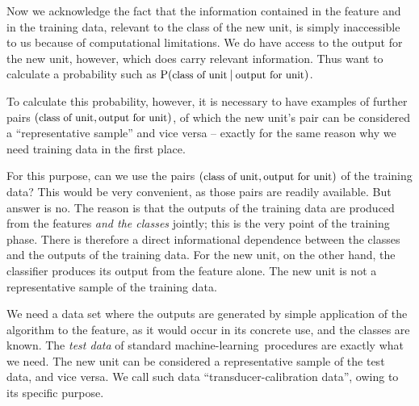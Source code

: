 \documentclass[\ifafour a4paper,12pt,\else a5paper,10pt,\fi%
onecolumn,oneside,article,%
british%
]{memoir}
\theoremstyle{remark}
\theoremstyle{innote}
\renewcommand*{\P}{\mathrm{P}}%
\renewcommand*{\|}[1][]{\nonscript\:#1\vert\nonscript\:\mathopen{}}
\newcommand*{\ml}{machine-learning}
\newcommand*{\texts}[1]{\text{\small #1}}
\begin{document}

Now we acknowledge the fact that the information contained in the feature and in the training data, relevant to the class of the new unit, is simply inaccessible to us because of computational limitations. We do have access to the output for the new unit, however, which does carry relevant information. Thus want to calculate a probability such as $\P(\texts{class of unit} \| \texts{output for unit})$.

To calculate this probability, however, it is necessary to have examples of further pairs $(\texts{class of unit}, \texts{output for unit})$, of which the new unit's pair can be considered a \enquote{representative sample} \autocites[for a critical analysis of the sometimes hollow term \enquote{representative sample} see][]{kruskaletal1979,kruskaletal1979b,kruskaletal1979c,kruskaletal1980} and vice versa -- exactly for the same reason why we need training data in the first place.

For this purpose, can we use the pairs $(\texts{class of unit}, \texts{output for unit})$ of the training data? This would be very convenient, as those pairs are readily available. But answer is no. The reason is that the outputs of the training data are produced from the features \emph{and the classes} jointly; this is the very point of the training phase. There is therefore a direct informational dependence between the classes and the outputs of the training data. For the new unit, on the other hand, the classifier produces its output from the feature alone. The new unit is not a representative sample of the training data.

We need a data set where the outputs are generated by simple application of the algorithm to the feature, as it would occur in its concrete use, and the classes are known. The \emph{test data} of standard \ml\ procedures are exactly what we need. The new unit can be considered a representative sample of the test data, and vice versa. We call such data \enquote{transducer-calibration data}, owing to its specific purpose.
\end{document}
